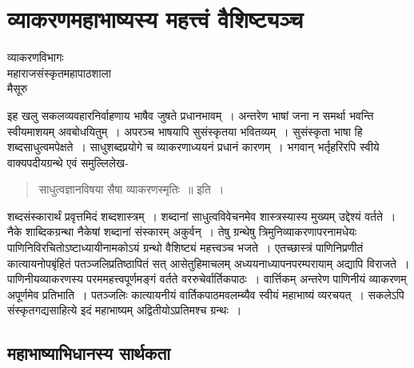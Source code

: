 {\fontsize{15}{17}\selectfont
\presetvalues
\chapter{व्याकरणमहाभाष्यस्य महत्त्वं वैशिष्ट्यञ्च}

\begin{center}
\smallskip

व्याकरणविभागः\\
महाराजसंस्कृतमहापाठशाला\\
मैसूरु
\addrule
\end{center}
 	
इह खलु सकलव्यवहारनिर्वाहणाय भाषैव जुषते प्रधानभावम्~। अन्तरेण भाषां जना न समर्था भवन्ति स्वीयमाशयम् अवबोधयितुम्~। अपरञ्च भाषयापि सुसंस्कृतया भवितव्यम्~। सुसंस्कृता भाषा हि शब्दसाधुत्वमपेक्षते~। साधुशब्दप्रयोगे च व्याकरणाध्ययनं प्रधानं कारणम्~। भगवान् भर्तृहरिरपि स्वीये वाक्यपदीयग्रन्थे एवं समुल्लिलेख-
\begin{verse}
साधुत्वज्ञानविषया सैषा व्याकरणस्मृतिः~॥ इति~। 
\end{verse}
शब्दसंस्कारार्थं प्रवृत्तमिदं शब्दशास्त्रम्~। शब्दानां साधुत्वविवेचनमेव शास्त्रस्यास्य मुख्यम् \break उद्देश्यं वर्तते~। नैके शाब्दिकग्रन्था नैकेषां शब्दानां संस्कारम् अकुर्वन्~। तेषु ग्रन्थेषु त्रिमुनि\-व्याकरणापरनामधेयः पाणिनिविरचितोऽष्टाध्यायीनामकोऽयं ग्रन्थो वैशिष्ट्यं महत्त्वञ्च \break भजते~। एतच्छास्त्रं पाणिनिप्रणीतं कात्यायनोपबृंहितं पतञ्जलिप्रतिष्ठापितं सत् आसेतुहि\-माचलम् अध्ययनाध्यापनपरम्परायाम् अद्यापि विराजते~। पाणिनीयव्याकरणस्य परम\-महत्त्वपूर्णमङ्गं वर्तते वररुचेर्वार्तिकपाठः~। वार्त्तिकम् अन्तरेण पाणिनीयं व्याकरणम् अपूर्णमेव प्रतिभाति~। पतञ्जलिः कात्यायनीयं वार्तिकपाठमवलम्ब्यैव स्वीयं महाभाष्यं व्यरचयत्~। सकलेऽपि संस्कृतगद्यसाहित्ये इदं महाभाष्यम् अद्वितीयोऽप्रतिमश्च ग्रन्थः~। 

\section*{महाभाष्याभिधानस्य सार्थकता}

}
